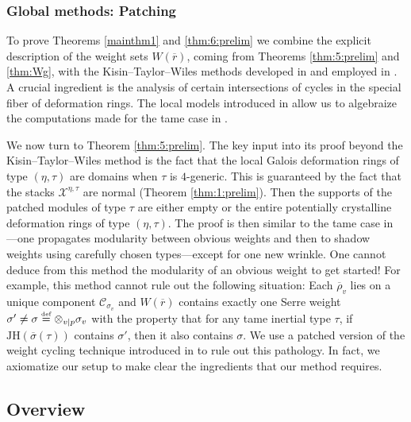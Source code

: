 \documentclass[oneside,a4paper,english, 11pt]{amsart}
\theoremstyle{plain}
\theoremstyle{plain}
\theoremstyle{plain}
\theoremstyle{plain}
\theoremstyle{plain}
\theoremstyle{plain}
\theoremstyle{definition}
\theoremstyle{definition}
\theoremstyle{definition}
\theoremstyle{remark}
\numberwithin{equation}{section}
\newcommand{\cC}{\mathcal{C}}
\newcommand{\cX}{\mathcal{X}}
\newcommand{\JH}{\mathrm{JH}}
\newcommand{\rbar}{\overline{r}}
\newcommand{\rhobar}{\overline{\rho}}
\newcommand{\defeq}{\stackrel{\textrm{\tiny{def}}}{=}}
\newcommand{\ovl}[1]{\overline{#1}}
\begin{document}
%
%
%
%
%

%
%

%
%
%
%
%
%
%




\subsubsection{Global methods: Patching} 

To prove Theorems \ref{mainthm1} and \ref{thm:6:prelim} we combine the explicit description of the weight sets $W(\rbar)$, coming from Theorems \ref{thm:5:prelim} and \ref{thm:Wg}, with the Kisin--Taylor--Wiles methods developed in \cite{EGS} and employed in \cite[\S 5]{LLLM2}. 
A crucial ingredient is the analysis of certain intersections of cycles in the special fiber of deformation rings.
The local models introduced in \cite{MLM} allow us to algebraize the computations made for the tame case in \cite[\S 3.6]{LLLM2}. 

We now turn to Theorem \ref{thm:5:prelim}. 
The key input into its proof beyond the Kisin--Taylor--Wiles method is the fact that the local Galois deformation rings of type $(\eta,\tau)$ are domains when $\tau$ is $4$-generic. 
This is guaranteed by the fact that the stacks $\cX^{\eta,\tau}$ are normal (Theorem \ref{thm:1:prelim}). 
Then the supports of the patched modules of type $\tau$ are either empty or the entire potentially crystalline deformation rings of type $(\eta,\tau)$. 
The proof is then similar to the tame case in \cite{LLLM2}---one propagates modularity between obvious weights and then to shadow weights using carefully chosen types---except for one new wrinkle. 
One cannot deduce from this method the modularity of an obvious weight to get started! 
For example, this method cannot rule out the following situation: Each $\rhobar_v$ lies on a unique component $\cC_{\sigma_v}$ and $W(\rbar)$ contains exactly one Serre weight $\sigma'\neq \sigma\defeq \otimes_{v|p}\sigma_v$ with the property that for any tame inertial type $\tau$, if $\JH(\ovl{\sigma}(\tau))$ contains $\sigma'$, then it also contains $\sigma$. 
We use a patched version of the weight cycling technique introduced in \cite{EGH} to rule out this pathology. 
In fact, we axiomatize our setup to make clear the ingredients that our method requires. 

\subsection{Overview}
\end{document}
